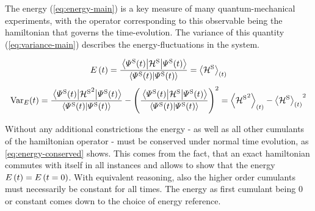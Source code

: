 The energy \energyOft (\autoref{eq:energy-main}) is a key measure of many quantum-mechanical experiments, with the operator corresponding to this observable being the hamiltonian that governs the time-evolution.
The variance \varianceOft of this quantity (\autoref{eq:variance-main}) describes the energy-fluctuations in the system.

\begin{equation}
    \label{eq:energy-main}
    \energyOft = \frac{\bracketHelper{\psiOfT[\schroedingerPicture]}{\pictureHamiltonian[\schroedingerPicture]}{\psiOfT[\schroedingerPicture]}}{\braketHelper{\psiOfT[\schroedingerPicture]}{\psiOfT[\schroedingerPicture]}}
       = \timeExpectationVal{\pictureHamiltonian[\schroedingerPicture]}
\end{equation}
\begin{equation}
    \label{eq:variance-main}
    \varianceOft = \frac{\bracketHelper{\psiOfT[\schroedingerPicture]}{{\pictureHamiltonian[\schroedingerPicture]}^2}{\psiOfT[\schroedingerPicture]}}{\braketHelper{\psiOfT[\schroedingerPicture]}{\psiOfT[\schroedingerPicture]}}-\left(\frac{\bracketHelper{\psiOfT[\schroedingerPicture]}{\pictureHamiltonian[\schroedingerPicture]}{\psiOfT[\schroedingerPicture]}}{\braketHelper{\psiOfT[\schroedingerPicture]}{\psiOfT[\schroedingerPicture]}}\right)^2
       = \timeExpectationVal{{\pictureHamiltonian[\schroedingerPicture]}^2} - {\timeExpectationVal{\pictureHamiltonian[\schroedingerPicture]}}^2
\end{equation}

Without any additional constrictions %
the energy - as well as all other cumulants of the hamiltonian operator - must be conserved under normal time evolution, as \autoref{eq:energy-conserved} shows. 
This comes from the fact, that an exact hamiltonian commutes with itself in all instances and allows to show that the energy $\energyOft = \energyOft[t=0]$.
With equivalent reasoning, also the higher order cumulants must necessarily be constant for all times.
The energy as first cumulant %
being 0 or constant comes down to the choice of energy reference.

